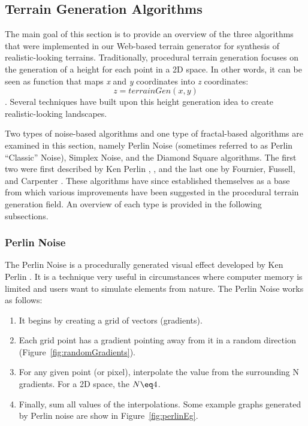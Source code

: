 \subsection{Terrain Generation Algorithms}

The main goal of this section is to provide an overview of the three algorithms that were implemented in our Web-based terrain generator for synthesis of realistic-looking terrains. Traditionally, procedural terrain generation focuses on the generation of a height for each point in a 2D space. In other words, it can be seen as function that maps \textit{x} and \textit{y} coordinates into \textit{z} coordinates: \[z=terrainGen(x, y)\]. Several techniques have built upon this height generation idea to create realistic-looking landscapes.

Two types of noise-based algorithms and one type of fractal-based algorithms are examined in this section, namely Perlin Noise (sometimes referred to as Perlin ``Classic'' Noise), Simplex Noise, and the Diamond Square algorithms. The first two were first described by Ken Perlin \cite{perlin:2002}, \cite{perlin:2001}, and the last one by Fournier, Fussell, and Carpenter \cite{fournier:1982}. These algorithms have since established themselves as a base from which various improvements have been suggested \cite{ong:2005, lechner:2006, pi:2006, li:2006, doran:2010} in the  procedural terrain generation field. An overview of each type is provided in the following subsections. 

\subsubsection{Perlin Noise}
The Perlin Noise is a procedurally generated visual effect developed by Ken Perlin \cite{perlin:2002}. It is a technique very useful in circumstances where computer memory is limited and users want to simulate elements from nature. The Perlin Noise works as follows:

\begin{enumerate}
\item It begins by creating a grid of vectors (gradients).
\item Each grid point has a gradient pointing away from it in a random direction (Figure~\ref{fig:randomGradients}).
\item For any given point (or pixel), interpolate the value from the surrounding N gradients. For a 2D space, the $N \eq 4$.
\item Finally, sum all values of the interpolations. Some example graphs generated by Perlin noise are show in Figure~\ref{fig:perlinEg}.
\end{enumerate}

